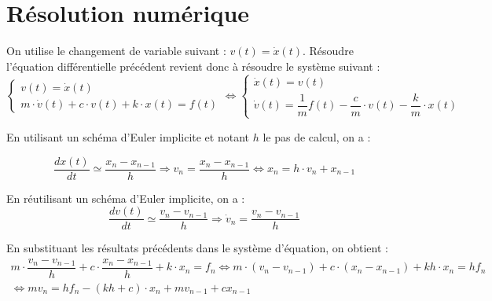 \documentclass[10pt,fleqn]{article} %
\begin{document}
\section{Résolution numérique}
On utilise le changement de variable suivant : $v(t) = \dot{x}(t)$. Résoudre l'équation différentielle précédent revient donc à résoudre le système suivant : 
\begin{equation}
\left\{ 
\begin{array}{l} 
v(t) = \dot{x}(t) \\ 
m\cdot\dot{v}(t)+c\cdot {v}(t) + k\cdot x(t) = f(t)
\end{array} \right.
\Longleftrightarrow
\left\{ 
\begin{array}{l} 
\dot{x}(t) = v(t)  \\ 
\dot{v}(t)= \dfrac{1}{m}f(t)-\dfrac{c}{m}\cdot {v}(t)- \dfrac{k}{m}\cdot x(t) 
\end{array} \right.
\end{equation}

En utilisant un schéma d'Euler implicite et notant $h$ le pas de calcul, on a : 

$$\dfrac{dx(t)}{dt} \simeq \dfrac{x_{n}-x_ {n-1}}{h}
\Longrightarrow
v_n = \dfrac{x_{n}-x_{n-1}}{h} \Longleftrightarrow x_{n} = h\cdot v_n + x_{n-1}$$

En réutilisant un schéma d'Euler implicite, on a :
$$\dfrac{dv(t)}{dt} \simeq \dfrac{v_{n}-v_ {n-1}}{h}
\Longrightarrow
\dot{v}_n = \dfrac{v_{n}-v_{n-1}}{h} $$

En substituant les résultats précédents dans le système d'équation, on obtient :
$$
\begin{array}{c}
m\cdot \dfrac{v_{n}-v_{n-1}}{h} +c\cdot \dfrac{x_{n}-x_{n-1}}{h} + k\cdot x_n = f_n
\Longleftrightarrow
m\cdot (v_{n}-v_{n-1}) +c\cdot (x_{n}-x_{n-1}) + kh\cdot x_n = hf_n  \\
\Longleftrightarrow mv_{n}  = hf_n -  (kh+c) \cdot x_n + mv_{n-1}+cx_{n-1} 
\end{array}
$$
\end{document}
